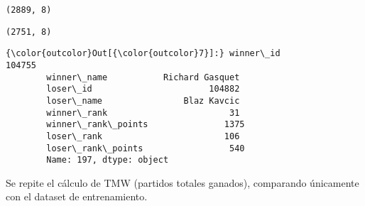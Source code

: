 \documentclass[11pt]{article}
\begin{document}
    
    \begin{verbatim}
(2889, 8)
    \end{verbatim}

    
    
    \begin{verbatim}
(2751, 8)
    \end{verbatim}

    
\begin{Verbatim}[commandchars=\\\{\}]
{\color{outcolor}Out[{\color{outcolor}7}]:} winner\_id                      104755
        winner\_name           Richard Gasquet
        loser\_id                       104882
        loser\_name                Blaz Kavcic
        winner\_rank                        31
        winner\_rank\_points               1375
        loser\_rank                        106
        loser\_rank\_points                 540
        Name: 197, dtype: object
\end{Verbatim}
            
    Se repite el cálculo de TMW (partidos totales ganados), comparando
únicamente con el dataset de entrenamiento.
\end{document}
